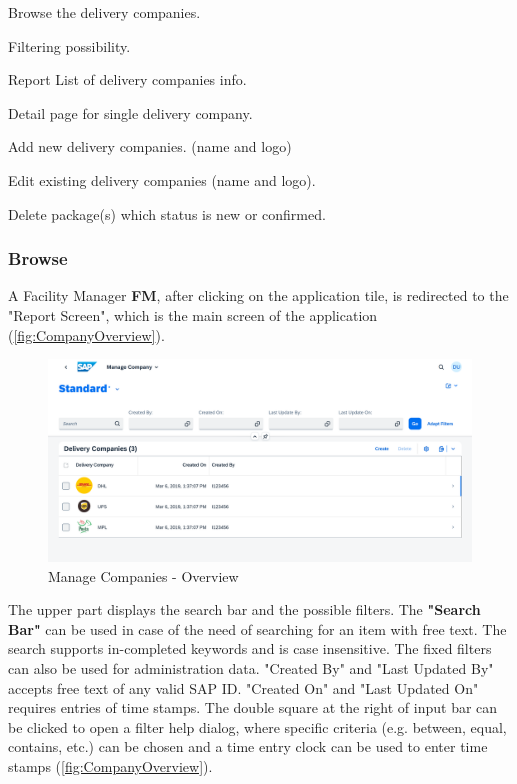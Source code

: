 \begin{compactenum}
	\item Browse the delivery companies.
        \begin{compactenum}
            \item Filtering possibility.
            \item Report List of delivery companies info.
            \item Detail page for single delivery company.
        \end{compactenum}
    \item Add new delivery companies. (name and logo)
    \item Edit existing delivery companies (name and logo).
    \item Delete package(s) which status is new or confirmed.
\end{compactenum}

\subsubsection{Browse}
A Facility Manager \textbf{FM}, after clicking on the application tile, is redirected to the "Report Screen", which is the main screen of the application (\autoref{fig:CompanyOverview}). 

\begin{figure}[H]
	\centering
	\includegraphics[width=1\linewidth]{images/user_doc/company/report/overview.png}
	\caption{Manage Companies - Overview}
	\label{fig:CompanyOverview}
\end{figure}

The upper part displays the search bar and the possible filters. 
The \textbf{"Search Bar"} can be used in case of the need of searching for an item with free text. The search supports in-completed keywords and is case insensitive. The fixed filters can also be used for administration data. "Created By" and "Last Updated By" accepts free text of any valid SAP ID. "Created On" and "Last Updated On" requires entries of time stamps. The double square at the right of input bar can be clicked to open a filter help dialog, where specific criteria (e.g. between, equal, contains, etc.) can be chosen and a time entry clock can be used to enter time stamps (\autoref{fig:CompanyOverview}). 

